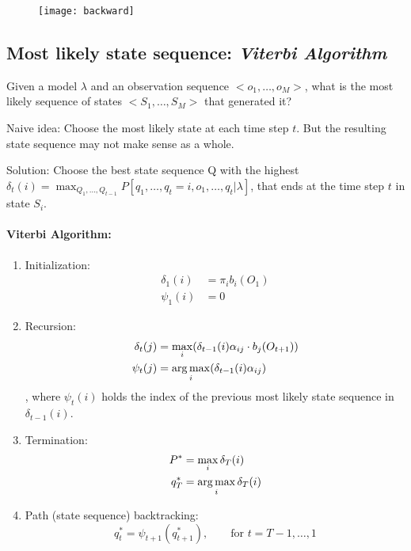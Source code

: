 \begin{figure}[H]
  \centering
  \texttt{[image: backward]}
\end{figure}

\subsection*{Most likely state sequence: \emph{Viterbi Algorithm}}

Given a model \(\lambda\) and an observation sequence \(<o_1,\dots, o_M>\), what is the most likely sequence of states \(<S_1,\dots, S_M>\) that generated it?

Naive idea: Choose the most likely state at each time step $t$. But the resulting state sequence may not make sense as a whole.

Solution: Choose the best state sequence Q with the highest $\delta_t(i) = \max_{Q_1, \ldots, Q_{t-1}} P[q_1, \ldots, q_t=i, o_1, \ldots, q_t | \lambda]$, that ends at the time step $t$ in state $S_i$.

\paragraph{Viterbi Algorithm:}

\begin{enumerate}
    \item Initialization:
        \begin{align*}
            \delta_1(i) &= \pi_i b_i(O_1)\\
            \psi_1(i) &= 0
        \end{align*}
    \item Recursion:
        \begin{align*}
            \delta_t(j) &= \max_i (\delta_{t-1}(i) \alpha_{ij} \cdot b_j(O_{t+1}))\\
            \psi_t(j) &= \operatorname*{arg\,max}_i (\delta_{t-1}(i) \alpha_{ij})
        \end{align*}
				, where $\psi_t(i)$ holds the index of the previous most likely state sequence in $\delta_{t-1}(i)$.
    \item Termination:
        \begin{align*}
            P^* &= \max_i \delta_T(i)\\
            q_T^* &= \operatorname*{arg\,max}_i \delta_T(i)
        \end{align*}
    \item Path (state sequence) backtracking:
        \[q_t^* = \psi_{t+1}(q_{t+1}^*), \qquad \text{for } t = T-1, \dots, 1\]
\end{enumerate}


